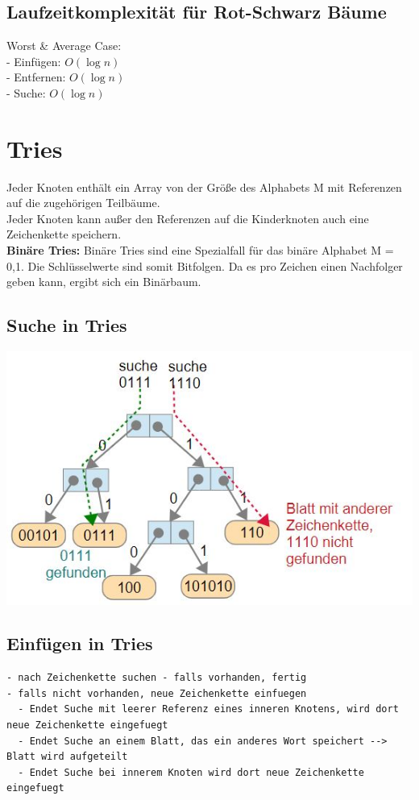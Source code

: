 \documentclass{scrreprt}
\begin{document}
\subsection{Laufzeitkomplexität für Rot-Schwarz Bäume}
Worst \& Average Case:
\\- Einfügen: $O(\log n)$
\\- Entfernen: $O(\log n)$
\\- Suche: $O(\log n)$
\section{Tries}
Jeder Knoten enthält ein Array von der Größe des Alphabets M mit Referenzen auf die zugehörigen Teilbäume.
\\Jeder Knoten kann außer den Referenzen auf die Kinderknoten auch eine Zeichenkette speichern.
\\\textbf{Binäre Tries:}
Binäre Tries sind eine Spezialfall für das binäre Alphabet M = {0,1}. Die Schlüsselwerte sind somit Bitfolgen.
Da es pro Zeichen einen Nachfolger geben kann, ergibt sich ein Binärbaum.
\subsection{Suche in Tries}
\includegraphics[width=1\textwidth]{graphics/trie-suche}
\subsection{Einfügen in Tries}
\begin{lstlisting}
- nach Zeichenkette suchen - falls vorhanden, fertig
- falls nicht vorhanden, neue Zeichenkette einfuegen
  - Endet Suche mit leerer Referenz eines inneren Knotens, wird dort neue Zeichenkette eingefuegt
  - Endet Suche an einem Blatt, das ein anderes Wort speichert --> Blatt wird aufgeteilt
  - Endet Suche bei innerem Knoten wird dort neue Zeichenkette eingefuegt
\end{lstlisting}
\end{document}
